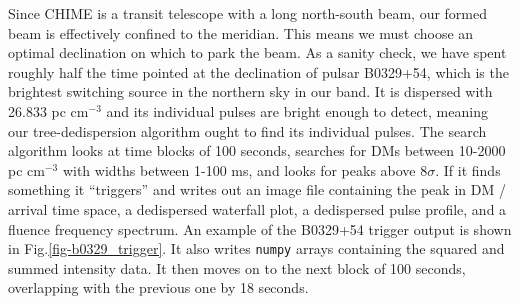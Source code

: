 Since CHIME is a transit telescope with a long north-south beam, 
our formed beam is effectively confined to the meridian. This means
we must choose an optimal declination on which 
to park the beam. As a sanity check, we have spent roughly 
half the time pointed 
at the declination of pulsar B0329+54, which is the 
brightest switching source in the northern sky in our band. It 
is dispersed with 26.833 pc cm$^{-3}$ and its individual 
pulses are bright enough to detect, meaning our tree-dedispersion 
algorithm ought to find its individual pulses. The search 
algorithm looks at time blocks of 100 seconds, searches 
for DMs between 10-2000 pc cm$^{-3}$ with widths between 
1-100 ms, and looks for peaks above 8$\sigma$. If it finds something
it ``triggers'' and writes out an image file containing the peak 
in DM / arrival time space, a dedispersed waterfall plot, a dedispersed 
pulse profile, and a fluence frequency spectrum. An example 
of the B0329+54 trigger output is shown in Fig.\ref{fig-b0329_trigger}. 
It also writes {\tt numpy} arrays containing the squared and summed 
intensity data. It then moves on to the next block of 100 seconds, 
overlapping with the previous one by 18 seconds. 


